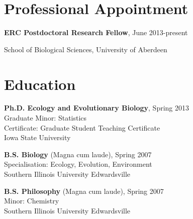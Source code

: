 \documentclass[letterpaper]{article}
\renewenvironment{itemize}{
  \begin{list}{}{
    \setlength{\leftmargin}{1.5em}
  }
}{
  \end{list}
}
\begin{document}
\begin{minipage}{0.62\linewidth}
\section*{Professional Appointment}
\begin{itemize}
	\item{\bf ERC Postdoctoral Research Fellow}, June 2013-present
	\item School of Biological Sciences, University of Aberdeen
\end{itemize}

\section*{Education}
\begin{itemize}
  \item {\bf Ph.D. Ecology and Evolutionary Biology}, Spring 2013 \\
	Graduate Minor: Statistics \\
	Certificate: Graduate Student Teaching Certificate \\
	Iowa State University
  \item {\bf B.S. Biology} (Magna cum laude), Spring 2007 \\
	Specialisation: Ecology, Evolution, Environment \\
	Southern Illinois University Edwardsville
  \item {\bf B.S. Philosophy} (Magna cum laude), Spring 2007 \\
	Minor: Chemistry \\
	Southern Illinois University Edwardsville
\end{itemize}


\end{minipage}
\end{document}
